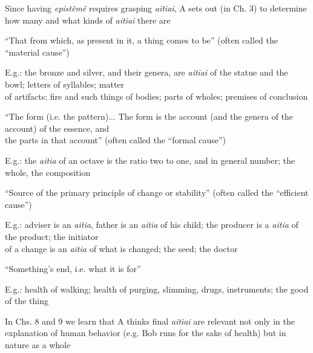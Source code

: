 \documentclass[11pt]{article}
\begin{document}
\noindent Since having \emph{epist\^{e}m\^{e}} requires grasping \emph{aitiai}, A sets out (in Ch. 3) to determine how many and what kinds of \emph{aitiai} there are
\vspace*{2mm}

\noindent [1] ``That from which, as present in it, a thing comes to be'' (often called the ``material cause'')
\vspace*{1mm}

E.g.: the bronze and silver, and their genera, are \emph{aitiai} of the statue and the bowl; letters of syllables; matter\\\hspace*{6mm}of artifacts; fire and such things of bodies; parts of wholes; premises of conclusion
\vspace*{2mm}

\noindent [2] ``The form (i.e. the pattern)... The form is the account (and the genera of the account) of the essence, and\\\hspace*{6mm}the parts in that account'' (often called the ``formal cause'')
\vspace*{1mm}

E.g.: the \emph{aitia} of an octave is the ratio two to one, and in general number; the whole, the composition
\vspace*{2mm}

\noindent [3] ``Source of the primary principle of change or stability'' (often called the ``efficient cause'')
\vspace*{1mm}

E.g.: adviser is an \emph{aitia}, father is an \emph{aitia} of his child; the producer is a \emph{aitia} of the product; the initiator\\\hspace*{6mm}of a change is an \emph{aitia} of what is changed; the seed; the doctor
\vspace*{2mm}

\noindent [4] ``Something's end, i.e. what it is for''
\vspace*{1mm}

E.g.: health of walking; health of purging, slimming, drugs, instruments; the good of the thing
\vspace*{2mm}

\noindent In Chs. 8 and 9 we learn that A thinks final \emph{aitiai} are relevant not only in the explanation of human behavior (e.g. Bob runs for the sake of health) but in nature as a whole
\newpage
\end{document}
